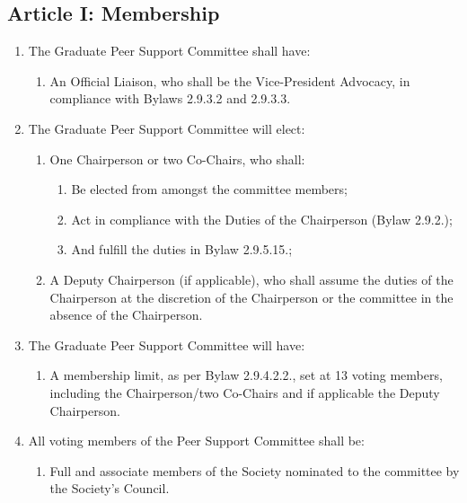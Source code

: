 \subsection{Article I: Membership}
\begin{enumerate}[label*=\arabic*., align=left]	
\item The Graduate Peer Support Committee shall have:
\begin{enumerate}[label*=\arabic*., align=left]	
\item An Official Liaison, who shall be the Vice-President Advocacy, in compliance with Bylaws 2.9.3.2 and 2.9.3.3.
\end{enumerate}
\item The Graduate Peer Support Committee will elect:
\begin{enumerate}[label*=\arabic*., align=left]
\item One Chairperson or two Co-Chairs, who shall:
\begin{enumerate}[label*=\arabic*., align=left]
\item Be elected from amongst the committee members;
\item Act in compliance with the Duties of the Chairperson (Bylaw 2.9.2.);
\item And fulfill the duties in Bylaw 2.9.5.15.;
\end{enumerate}
\item A Deputy Chairperson (if applicable), who shall assume the duties of the     Chairperson at the discretion of the Chairperson or the committee in the absence of the Chairperson.
\end{enumerate}
\item The Graduate Peer Support Committee will have:
\begin{enumerate}[label*=\arabic*., align=left]
\item A membership limit, as per Bylaw 2.9.4.2.2., set at 13 voting members, including the Chairperson/two Co-Chairs and if applicable the Deputy Chairperson.
\end{enumerate}
\item All voting members of the Peer Support Committee shall be:
\begin{enumerate}[label*=\arabic*., align=left]
\item Full and associate members of the Society nominated to the committee by the Society’s Council.   
\end{enumerate}
\end{enumerate}

